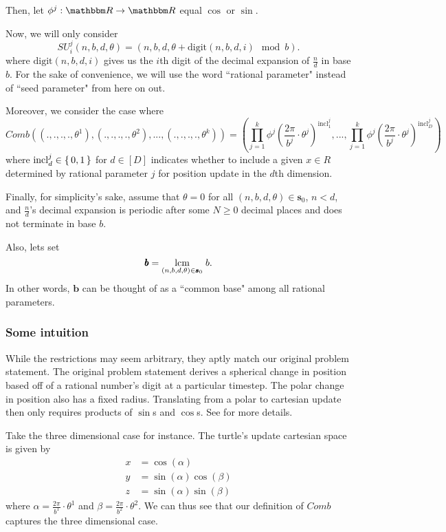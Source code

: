 \documentclass[11pt,titlepage]{article}
\newcommand{\comb}{Comb}
\newcommand{\inclIndic}[2]{{\mathrm{incl}_{#1}^{#2}}}
\newcommand{\numbToAngle}{\frac{2\pi}{b^j}}
\newcommand{\numbToAngleNoJ}[1]{\frac{2\pi}{b^{#1}}}
\newcommand{\commonBase}{{\pmb{b}}}
\newcommand{\sinOrCos}{\phi^j}
\newcommand{\combSingleTerm}[1]{\prod_{j=1}^k \sinOrCos\left(\numbToAngle \cdot \theta^j\right) ^ {\inclIndic{#1}{j}}}
\begin{document}
Then, let $\sinOrCos: \R \rightarrow \R$ equal $\cos$ or $\sin$. 

Now, we will only consider
$$
  SU_i^j(n, b, d, \theta) = (n, b, d, \theta + \mathrm{digit}(n, b, d, i) \mod b).
$$
where $\mathrm{digit}(n, b, d, i)$ gives us the $i$th digit of the decimal expansion of $\frac{n}{d}$
in base $b$. For the sake of convenience, we will use the word ``rational parameter" 
instead of ``seed parameter" from here on out.

Moreover, we consider the case where
$$
  Comb((., ., ., ., \theta^1), (., ., ., ., \theta^2), ..., (., ., ., ., \theta^k)) =
    \left(\combSingleTerm{1}, ..., \combSingleTerm{D}\right)
$$
where $\mathrm{incl}_d^j \in \set{0, 1}$ for $d \in [D]$ indicates whether to include a given
$x \in R$ determined by rational parameter $j$ for position update in the $d$th dimension.

Finally, for simplicity's sake, assume that $\theta = 0$ for all $(n, b, d, \theta) \in \pmb{s}_0$,
$n < d$, and $\frac{n}{d}$'s decimal expansion is periodic after some $N \geq 0$ decimal places
and does not terminate in base $b$.

Also, lets set 
$$\commonBase = \lcm{(n, b, d, \theta) \in \pmb{s}_0} b.$$
In other words,
$\commonBase$ can be thought of as a ``common base" among all rational parameters.

\subsubsection{Some intuition}
While the restrictions may seem arbitrary, they aptly match our original problem statement.
The original problem statement derives a spherical change in position based off of a rational number's
digit at a particular timestep. The polar change in position also has a fixed radius. Translating
from a polar to cartesian update then only requires products of $\sin$s and $\cos$s. See \cite{NDimSphericalCoord}
for more details.

Take the three dimensional case for instance. The turtle's update cartesian space
is given by 
\begin{align*}
  x &= \cos(\alpha)\\
  y &= \sin(\alpha) \cos(\beta)\\
  z &= \sin(\alpha) \sin(\beta)
\end{align*}
where $\alpha = \numbToAngleNoJ{1} \cdot \theta^1$ and 
$\beta = \numbToAngleNoJ{2} \cdot \theta^2$. We can thus see that our definition
of $\comb$ captures the three dimensional case.
\end{document}
